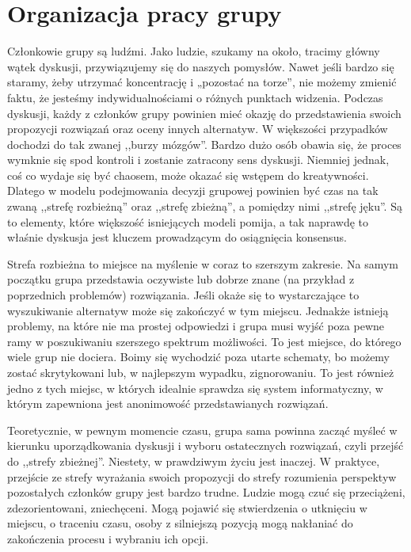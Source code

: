 
\section{Organizacja pracy grupy}
Członkowie grupy są ludźmi. Jako ludzie, szukamy na około, tracimy główny wątek 
dyskusji, przywiązujemy się do naszych pomysłów. Nawet jeśli bardzo się staramy,
żeby utrzymać koncentrację i „pozostać na torze”, nie możemy zmienić faktu, że 
jesteśmy indywidualnościami o różnych punktach widzenia. Podczas dyskusji, 
każdy z członków grupy powinien mieć okazję do przedstawienia swoich propozycji 
rozwiązań oraz oceny innych alternatyw. W większości przypadków dochodzi do tak 
zwanej ,,burzy mózgów''. Bardzo dużo osób obawia się, że proces wymknie się spod
kontroli i zostanie zatracony sens dyskusji. Niemniej jednak, coś co wydaje się 
być chaosem, może okazać się wstępem do kreatywności. Dlatego w modelu 
podejmowania decyzji grupowej powinien być czas na tak zwaną ,,strefę
rozbieżną'' oraz ,,strefę zbieżną'', a pomiędzy nimi ,,strefę jęku''. Są to
elementy, które większość isniejących modeli pomija, a tak naprawdę to właśnie
dyskusja jest kluczem prowadzącym do osiągnięcia konsensus.

Strefa rozbieżna to miejsce na myślenie w coraz to szerszym zakresie. Na samym 
początku grupa przedstawia oczywiste lub dobrze znane (na przykład z 
poprzednich problemów) rozwiązania. Jeśli okaże się to wystarczające to 
wyszukiwanie alternatyw może się zakończyć w tym miejscu. Jednakże istnieją 
problemy, na które nie ma prostej odpowiedzi i grupa musi wyjść poza pewne ramy 
w poszukiwaniu szerszego spektrum możliwości. To jest miejsce, do którego wiele 
grup nie dociera. Boimy się wychodzić poza utarte schematy, bo możemy zostać 
skrytykowani lub, w najlepszym wypadku, zignorowaniu. To jest również jedno z 
tych miejsc, w których idealnie sprawdza się system informatyczny, w którym 
zapewniona jest anonimowość przedstawianych rozwiązań.

Teoretycznie, w pewnym momencie czasu, grupa sama powinna zacząć myśleć w 
kierunku uporządkowania dyskusji i wyboru ostatecznych rozwiązań, czyli  przejść
do ,,strefy zbieżnej''. Niestety, w prawdziwym życiu jest inaczej. W praktyce,
przejście ze strefy wyrażania swoich propozycji do strefy rozumienia perspektyw 
pozostałych członków grupy jest bardzo trudne. Ludzie mogą czuć się przeciążeni,
zdezorientowani, zniechęceni. Mogą pojawić się stwierdzenia o utknięciu w 
miejscu, o traceniu czasu, osoby  z silniejszą pozycją mogą nakłaniać do 
zakończenia procesu i wybraniu ich opcji.

